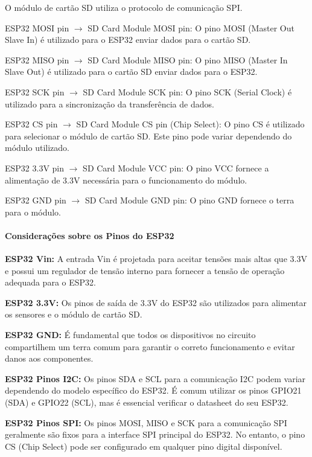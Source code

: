 O módulo de cartão SD utiliza o protocolo de comunicação SPI.

ESP32 MOSI pin $\rightarrow$ SD Card Module MOSI pin: O pino MOSI (Master Out Slave In) é utilizado para o ESP32 enviar dados para o cartão SD.

ESP32 MISO pin $\rightarrow$ SD Card Module MISO pin: O pino MISO (Master In Slave Out) é utilizado para o cartão SD enviar dados para o ESP32.

ESP32 SCK pin $\rightarrow$ SD Card Module SCK pin: O pino SCK (Serial Clock) é utilizado para a sincronização da transferência de dados.

ESP32 CS pin $\rightarrow$ SD Card Module CS pin (Chip Select): O pino CS é utilizado para selecionar o módulo de cartão SD. Este pino pode variar dependendo do módulo utilizado.

ESP32 3.3V pin $\rightarrow$ SD Card Module VCC pin: O pino VCC fornece a alimentação de 3.3V necessária para o funcionamento do módulo.

ESP32 GND pin $\rightarrow$ SD Card Module GND pin: O pino GND fornece o terra para o módulo.

\paragraph{Considerações sobre os Pinos do ESP32}

\textbf{ESP32 Vin:} A entrada Vin é projetada para aceitar tensões mais altas que 3.3V e possui um regulador de tensão interno para fornecer a tensão de operação adequada para o ESP32.

\textbf{ESP32 3.3V:} Os pinos de saída de 3.3V do ESP32 são utilizados para alimentar os sensores e o módulo de cartão SD.

\textbf{ESP32 GND:} É fundamental que todos os dispositivos no circuito compartilhem um terra comum para garantir o correto funcionamento e evitar danos aos componentes.

\textbf{ESP32 Pinos I2C:} Os pinos SDA e SCL para a comunicação I2C podem variar dependendo do modelo específico do ESP32. É comum utilizar os pinos GPIO21 (SDA) e GPIO22 (SCL), mas é essencial verificar o datasheet do seu ESP32.

\textbf{ESP32 Pinos SPI:} Os pinos MOSI, MISO e SCK para a comunicação SPI geralmente são fixos para a interface SPI principal do ESP32. No entanto, o pino CS (Chip Select) pode ser configurado em qualquer pino digital disponível.